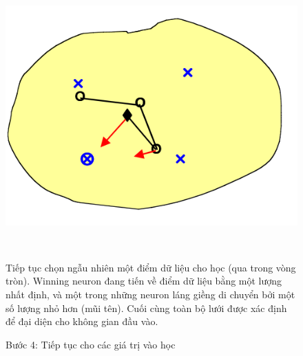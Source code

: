 \begin{figure}[h!]
  \begin{minipage}{0.4\textwidth}
	\centering
    \includegraphics[width=1\textwidth,keepaspectratio=true]{SOM5.png}
    \caption{Bước 4: Tiếp tục cho các giá trị vào học}
  \end{minipage}
  ~
  \begin{minipage}{0.6\textwidth}
  Tiếp tục chọn ngẫu nhiên một điểm dữ liệu cho học (qua trong vòng tròn).
  Winning neuron đang tiến về điểm dữ liệu bằng một lượng nhất định, và một
  trong những neuron láng giềng di chuyển bởi một số lượng nhỏ hơn (mũi
  tên).
  Cuối cùng toàn bộ lưới được xác định để đại diện cho không gian đầu vào.
  \end{minipage}
\end{figure}

